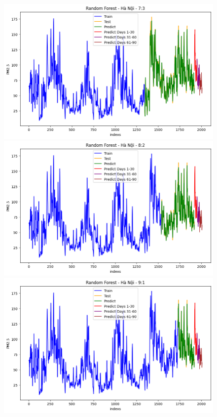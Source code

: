\begin{figure}[H]
{\begin{adjustbox}{minipage=0.48\textwidth}
\begin{minipage}{0.3\textwidth}
            \end{minipage}\hfill
            \begin{minipage}{0.3\textwidth}
                \centering
                \includegraphics[width=\textwidth]{img/final/RF/90D/RF_7_3_HN.png}\\
                \includegraphics[width=\textwidth]{img/final/RF/90D/RF_8_2_HN.png}\\
                \includegraphics[width=\textwidth]{img/final/RF/90D/RF_9_1_HN.png}

\end{minipage}
\end{adjustbox}}
\end{figure}
